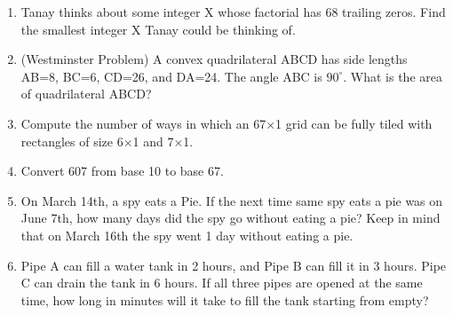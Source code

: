 \documentclass[a4paper]{article}
\begin{document}
\begin{enumerate}[itemsep=2cm]
    \item Tanay thinks about some integer X whose factorial has 68 trailing zeros. Find the smallest integer X Tanay could be thinking of.
    \item (Westminster Problem) A convex quadrilateral ABCD has side lengths AB=8, BC=6, CD=26, and DA=24. The angle \angle ABC is $90^{\circ}$. What is the area of quadrilateral ABCD?
    \item Compute the number of ways in which an 67×1 grid can be fully tiled with rectangles of size 6×1 and 7×1.
    \item Convert 607 from base 10 to base 67.
    \item On March 14th, a spy eats a Pie. If the next time same spy eats a pie was on June 7th, how many days did the spy go without eating a pie? Keep in mind that on March 16th the spy went 1 day without eating a pie.
    \item Pipe A can fill a water tank in 2 hours, and Pipe B can fill it in 3 hours. Pipe C can drain the tank in 6 hours. If all three pipes are opened at the same time, how long in minutes will it take to fill the tank starting from empty?
    
\end{enumerate}
\end{document}

